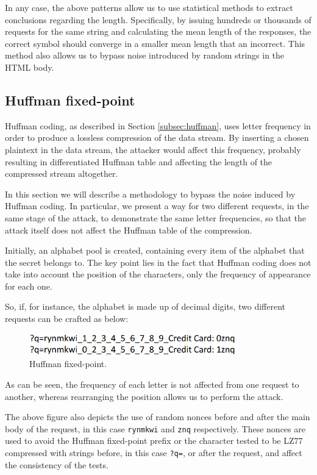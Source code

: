 In any case, the above patterns allow us to use statistical methods to extract
conclusions regarding the length. Specifically, by issuing hundreds or thousands
of requests for the same string and calculating the mean length of the
responses, the correct symbol should converge in a smaller mean length that an
incorrect. This method also allows us to bypass noise introduced by random
strings in the HTML body.

\subsection{Huffman fixed-point}

Huffman coding, as described in Section \ref{subsec:huffman}, uses letter
frequency in order to produce a lossless compression of the data stream. By
inserting a chosen plaintext in the data stream, the attacker would affect this
frequency, probably resulting in differentiated Huffman table and affecting the
length of the compressed stream altogether.

In this section we will describe a methodology to bypass the noise induced by
Huffman coding. In particular, we present a way for two different requests, in
the same stage of the attack, to demonstrate the same letter frequencies, so
that the attack itself does not affect the Huffman table of the compression.

Initially, an alphabet pool is created, containing every item of the alphabet
that the secret belongs to. The key point lies in the fact that Huffman coding
does not take into account the position of the characters, only the frequency of
appearance for each one.

So, if, for instance, the alphabet is made up of decimal digits, two different
requests can be crafted as below:

\begin{figure}[H] \caption{Huffman fixed-point.} \centering
\includegraphics[width=0.8\textwidth]{diagrams/huffman_fixed_point.png}\end{figure}

As can be seen, the frequency of each letter is not affected from one request to
another, whereas rearranging the position allows us to perform the attack.

The above figure also depicts the use of random nonces before and after the main
body of the request, in this case \texttt{rynmkwi} and \texttt{znq}
respectively. These nonces are used to avoid the Huffman fixed-point prefix or
the character tested to be LZ77 compressed with strings before, in this case
\texttt{?q=}, or after the request, and affect the consistency of the tests.

